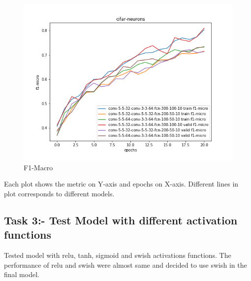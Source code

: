 \documentclass{article}
\begin{document}
\begin{figure}[!htb]
	\includegraphics[width=\linewidth]{../output_plots/CIFAR/task-2/cifar-neurons-F1-micro-score-f1-micro.png}
	\caption{F1-Macro}\label{fig:part_2_task_2_f1-macro}
	\endminipage
\end{figure}

Each plot shows the metric on Y-axis and epochs on X-axis. Different lines in plot corresponds to different models.

\subsection{Task 3:- Test Model with different activation functions}

Tested model with relu, tanh, sigmoid and swish activations functions. The performance of relu and swish were almost same and decided to use swish in the final model.
\end{document}
